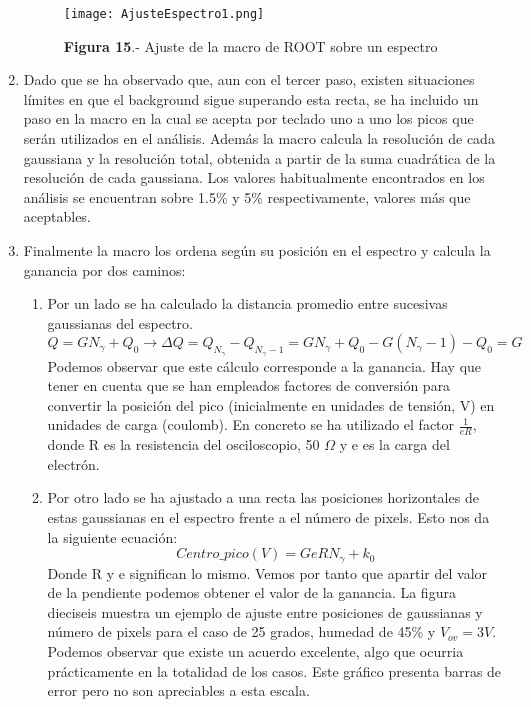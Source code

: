 \begin{enumerate}
\begin{figure}[hbtp]
\centering
\texttt{[image: AjusteEspectro1.png]}
\caption{\textbf{Figura 15}.- Ajuste de la macro de ROOT sobre un espectro}
\end{figure}

\item {} Dado que se ha observado que, aun con el tercer paso, existen situaciones límites en que el background sigue superando esta recta, se ha incluido un paso en la macro en la cual se acepta por teclado uno a uno los picos que serán utilizados en el análisis. Además la macro calcula la resolución de cada gaussiana y la resolución total, obtenida a partir de la suma cuadrática de la resolución de cada gaussiana. Los valores habitualmente encontrados en los análisis se encuentran sobre 1.5\% y 5\% respectivamente, valores más que aceptables.

\item {} Finalmente la macro los ordena según su posición en el espectro y calcula la ganancia por dos caminos:
	\begin{enumerate}

	\item {} Por un lado se ha calculado la distancia promedio entre sucesivas gaussianas del espectro.
	\begin{equation} 
	Q = G N_\gamma + Q_0 \longrightarrow \Delta Q= Q_{N_\gamma} - Q_{N_\gamma -1}=G N_\gamma+ Q_0 - G(N_		\gamma -1) - Q_0 = G
	\label{gananciametodo1}
	\end{equation}
	Podemos observar que este cálculo corresponde a la ganancia. Hay que tener en cuenta que se han empleados factores de conversión para convertir la posición del pico (inicialmente en unidades de	tensión, V) en unidades de carga (coulomb). En concreto se ha utilizado el factor $\frac{1}{eR}$, donde R es la resistencia del osciloscopio, 50 $\Omega$ y e es la carga del electrón.
	
	\item {} Por otro lado se ha ajustado a una recta las posiciones horizontales de estas gaussianas en el 	espectro frente a el número de pixels. Esto nos da la siguiente ecuación:
	\begin{equation}
	Centro\_pico(V) = GeRN_\gamma + k_0
	\label{gananciametodo2}
	\end{equation}
	Donde R y e significan lo mismo. Vemos por tanto que apartir del valor de la pendiente podemos obtener	el valor de la ganancia. La figura dieciseis muestra un ejemplo de ajuste entre posiciones de gaussianas y número de pixels para el caso de 25 grados, humedad de 45\% y $V_{ov}=3V$. Podemos observar que existe	un acuerdo excelente, algo que ocurria prácticamente en la totalidad de los casos. Este gráfico presenta barras de error pero no son apreciables a esta escala.
		

\end{enumerate}
\end{enumerate}
